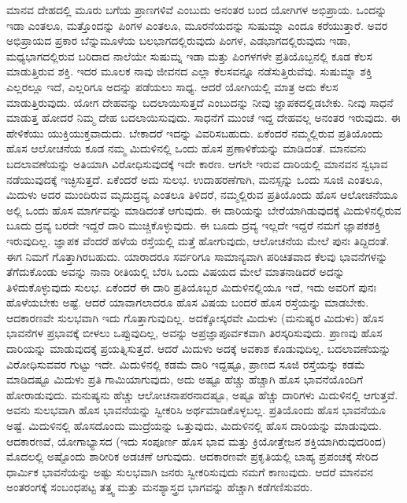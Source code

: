 ಮಾನವ ದೇಹದಲ್ಲಿ ಮೂರು ಬಗೆಯ ಪ್ರಾಣಗಳಿವೆ ಎಂಬುದು ಅನಂತರ ಬಂದ ಯೋಗಿಗಳ ಅಭಿಪ್ರಾಯ. ಒಂದನ್ನು ಇಡಾ ಎಂತಲೂ, ಮತ್ತೊಂದನ್ನು ಪಿಂಗಳ ಎಂತಲೂ, ಮೂರನೆಯದನ್ನು ಸುಷುಮ್ನಾ ಎಂದೂ ಕರೆಯುತ್ತಾರೆ. ಅವರ ಅಭಿಪ್ರಾಯದ ಪ್ರಕಾರ ಬೆನ್ನುಮೂಳೆಯ ಬಲಭಾಗದಲ್ಲಿರುವುದು ಪಿಂಗಳ, ಎಡಭಾಗದಲ್ಲಿರುವುದು ಇಡಾ, ಮಧ್ಯಭಾಗದಲ್ಲಿರುವ ಬರಿದಾದ ನಾಲೆಯೇ ಸುಷುಮ್ನ ಇಡಾ ಮತ್ತು ಪಿಂಗಳಗಳೇ ಪ್ರತಿಯೊಬ್ಬನಲ್ಲಿ ಕೂಡ ಕೆಲಸ ಮಾಡುತ್ತಿರುವ ಶಕ್ತಿ. ಇದರ ಮೂಲಕ ನಾವು ಜೀವನದ ಎಲ್ಲಾ ಕೆಲಸವನ್ನೂ ನಡೆಸುತ್ತಿರುವೆವು. ಸುಷುಮ್ನಾ ಶಕ್ತಿ ಎಲ್ಲರಲ್ಲೂ ಇದೆ, ಎಲ್ಲರಿಗೂ ಅದನ್ನು ಪಡೆಯಲು ಸಾಧ್ಯ. ಆದರೆ ಯೋಗಿಯಲ್ಲಿ ಮಾತ್ರ ಅದು ಕೆಲಸ ಮಾಡುತ್ತಿರುವುದು. ಯೋಗ ದೇಹವನ್ನು ಬದಲಾಯಿಸುತ್ತದೆ ಎಂಬುದನ್ನು ನೀವು ಜ್ಞಾಪಕದಲ್ಲಿಡಬೇಕು. ನೀವು ಸಾಧನೆ ಮಾಡುತ್ತ ಹೋದರೆ ನಿಮ್ಮ ದೇಹ ಬದಲಾಯಿಸುವುದು. ಸಾಧನೆಗೆ ಮುಂಚೆ ಇದ್ದ ದೇಹವಲ್ಲ ಅನಂತರ ಇರುವುದು. ಈ ಹೇಳಿಕೆಯು ಯುಕ್ತಿಯುಕ್ತವಾದುದು. ಬೇಕಾದರೆ ಇದನ್ನು ವಿವರಿಸಬಹುದು. ಏಕೆಂದರೆ ನಮ್ಮಲ್ಲಿರುವ ಪ್ರತಿಯೊಂದು ಹೊಸ ಆಲೋಚನೆಯ ಕೂಡ ನಮ್ಮ ಮಿದುಳಿನಲ್ಲಿ ಒಂದು ಹೊಸ ಪ್ರಣಾಳಿಕೆಯನ್ನು ಮಾಡಿದಂತೆ. ಮಾನವನು ಬದಲಾವಣೆಯನ್ನು ಅತಿಯಾಗಿ ವಿರೋಧಿಸುವುದಕ್ಕೆ ಇದೇ ಕಾರಣ. ಆಗಲೇ ಇರುವ ದಾರಿಯಲ್ಲಿ ಮಾನವನ ಸ್ವಭಾವ ನಡೆಯುವುದಕ್ಕೆ ಇಚ್ಛಿಸುತ್ತದೆ. ಏಕೆಂದರೆ ಅದು ಸುಲಭ. ಉದಾಹರಣೆಗಾಗಿ, ಮನಸ್ಸನ್ನು ಒಂದು ಸೂಜಿ ಎಂತಲೂ, ಮಿದುಳು ಅದರ ಮುಂದಿರುವ ಮೃದುದ್ರವ್ಯ ಎಂತಲೂ ತಿಳಿದರೆ, ನಮ್ಮಲ್ಲಿರುವ ಪ್ರತಿಯೊಂದು ಹೊಸ ಆಲೋಚನೆಯೂ ಅಲ್ಲಿ ಒಂದು ಹೊಸ ಮಾರ್ಗವನ್ನು ಮಾಡಿದಂತೆ ಆಗುವುದು. ಈ ದಾರಿಯನ್ನು ಬೇರೆಯಾಗಿಡುವುದಕ್ಕೆ ಮಿದುಳಿನಲ್ಲಿರುವ ಬೂದು ದ್ರವ್ಯ  ಬರದೇ ಇದ್ದರೆ ದಾರಿ ಮುಚ್ಚಿಕೊಳ್ಳುವುದು. ಈ ಬೂದು ದ್ರವ್ಯ ಇಲ್ಲದೇ ಇದ್ದರೆ ನಮಗೆ ಜ್ಞಾಪಕಶಕ್ತಿ ಇರುವುದಿಲ್ಲ. ಜ್ಞಾಪಕ ವೆಂದರೆ ಹಳೆಯ ರಸ್ತೆಯಲ್ಲಿ ಮತ್ತೆ ಹೋಗುವುದು, ಆಲೋಚನೆಯ ಮೇಲೆ ಪುನಃ ತಿದ್ದಿದಂತೆ. ಈಗ ನಿಮಗೆ ಗೊತ್ತಾಗಿರಬಹುದು. ಯಾರಾದರೂ ಸರ್ವರಿಗೂ ಸಾಮಾನ್ಯವಾಗಿ ಪರಿಚಿತವಾದ ಕೆಲವು ಭಾವನೆಗಳನ್ನು ತೆಗೆದುಕೊಂಡು ಅವನ್ನು ನಾನಾ ರೀತಿಯಲ್ಲಿ ಬೆರಸಿ ಒಂದು ವಿಷಯದ ಮೇಲೆ ಮಾತನಾಡಿದರೆ ಅದನ್ನು ತಿಳಿದುಕೊಳ್ಳುವುದು ಸುಲಭ. ಏಕೆಂದರೆ ಈ ದಾರಿ ಪ್ರತಿಯೊಬ್ಬರ ಮಿದುಳಿನಲ್ಲಿಯೂ ಇದೆ, ಇದು ಅವರಿಗೆ ಪುನಃ ಹೊಳೆಯಬೇಕು ಅಷ್ಟೆ. ಆದರೆ ಯಾವಾಗಲಾದರೂ ಹೊಸ ವಿಷಯ ಬಂದರೆ ಹೊಸ ರಸ್ತೆಯನ್ನು ಮಾಡಬೇಕು. ಆದಕಾರಣವೇ ಸುಲಭವಾಗಿ ಇದು ಗೊತ್ತಾಗುವುದಿಲ್ಲ. ಅದಕ್ಕೋಸ್ಕರವೇ ಮಿದುಳು (ಮನುಷ್ಯರ ಮಿದುಳು) ಹೊಸ ಭಾವನೆಗಳ ಪ್ರಭಾವಕ್ಕೆ ಬೀಳಲು ಒಪ್ಪುವುದಿಲ್ಲ, ಅವನ್ನು ಅಪ್ರಜ್ಞಾಪೂರ್ವಕವಾಗಿ ತಿರಸ್ಕರಿಸುವುದು. ಪ್ರಾಣವು ಹೊಸ ದಾರಿಯನ್ನು ಮಾಡುವುದಕ್ಕೆ ಪ್ರಯತ್ನಿಸುತ್ತದೆ. ಆದರೆ ಮಿದುಳು ಅದಕ್ಕೆ ಅವಕಾಶ ಕೊಡುವುದಿಲ್ಲ. ಬದಲಾವಣೆಯನ್ನು ವಿರೋಧಿಸುವವರ ಗುಟ್ಟು ಇದೇ. ಮಿದುಳಿನಲ್ಲಿ ಕಡಮೆ ದಾರಿ ಇದ್ದಷ್ಟೂ, ಪ್ರಾಣದ ಸೂಜಿ ರಸ್ತೆಯನ್ನು ಕಡಮೆ ಮಾಡಿದಷ್ಟೂ ಮಿದುಳು ಪ್ರತಿ ಗಾಮಿಯಾಗುವುದು, ಅದು ಅಷ್ಟೂ ಹೆಚ್ಚು ಹೆಚ್ಚಾಗಿ ಹೊಸ ಭಾವನೆಯೊಂದಿಗೆ ಹೋರಾಡುವುದು. ಮನುಷ್ಯನು ಹೆಚ್ಚು ಆಲೋಚನಾಪರನಾದಷ್ಟೂ, ಅಷ್ಟೂ ಹೆಚ್ಚು ದಾರಿಗಳು ಮಿದುಳಿನಲ್ಲಿ ಆಗುತ್ತವೆ. ಅವನು ಸುಲಭವಾಗಿ ಹೊಸ ಭಾವನೆಯನ್ನು ಸ್ವೀಕರಿಸಿ ಅರ್ಥಮಾಡಿಕೊಳ್ಳಬಲ್ಲ. ಪ್ರತಿಯೊಂದು ಹೊಸ ಭಾವನೆಯೂ ಅಷ್ಟೆ. ಮಿದುಳಿನಲ್ಲಿ ಹೊಸದೊಂದು ಮುದ್ರೆಯನ್ನು ಒತ್ತುವುದು, ಮಿದುಳಿನಲ್ಲಿ ಹೊಸ ದಾರಿಯನ್ನು ಮಾಡುವುದು. ಆದಕಾರಣವೆ, ಯೋಗಾಭ್ಯಾಸದ (ಇದು ಸಂಪೂರ್ಣ ಹೊಸ ಭಾವ ಮತ್ತು ಕ್ರಿಯೋತ್ತೇಜನ ಶಕ್ತಿಯಾಗಿರುವುದರಿಂದ) ಮೊದಲಲ್ಲಿ ಅಷ್ಟೊಂದು ಶಾರೀರಿಕ ಅಡಚಣೆ ಆಗುವುದು. ಆದಕಾರಣವೇ ಪ್ರಕೃತಿಯಲ್ಲಿ ಬಾಹ್ಯ ಪ್ರಪಂಚಕ್ಕೆ ಸೇರಿದ ಧಾರ್ಮಿಕ ಭಾವನೆಯನ್ನು ಅಷ್ಟು ಸುಲಭವಾಗಿ ಜನರು ಸ್ವೀಕರಿಸುವುದು ನಮಗೆ ಕಾಣುವುದು. ಆದರೆ ಮಾನವನ ಅಂತರಂಗಕ್ಕೆ ಸಂಬಂಧಪಟ್ಟ ತತ್ತ್ವ ಮತ್ತು ಮನಶ್ಯಾಸ್ತ್ರದ ಭಾಗವನ್ನು ಹೆಚ್ಚಾಗಿ ಕಡೆಗಣಿಸುವರು. 

